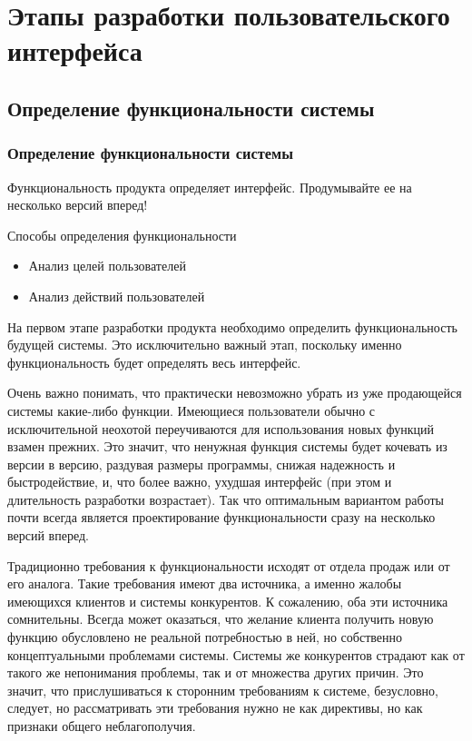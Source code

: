 \documentclass{../industrial-development}
\begin{document}
\section{Этапы разработки пользовательского интерфейса}

\subsection{Определение функциональности системы}

\begin{frame} \frametitle{Определение функциональности системы}

  \begin{block}{}
     Функциональность продукта определяет интерфейс. Продумывайте ее  на несколько версий вперед!
  \end{block}
  
  \begin{block}{Способы определения функциональности}
    \begin{itemize}
    \item Анализ целей пользователей
    \item Анализ действий пользователей
    \end{itemize}
  \end{block}
\end{frame}

\lecturenotes

На первом этапе разработки продукта необходимо определить функциональность будущей системы. Это исключительно важный этап, поскольку именно функциональность будет определять весь интерфейс.

Очень важно понимать, что практически невозможно убрать из уже продающейся системы какие-либо функции. Имеющиеся пользователи обычно с исключительной неохотой переучиваются для использования новых функций взамен прежних. Это значит, что ненужная функция системы будет кочевать из версии в версию, раздувая размеры программы, снижая надежность и быстродействие, и, что более важно, ухудшая интерфейс (при этом и длительность разработки возрастает). Так что оптимальным вариантом работы почти всегда является проектирование функциональности сразу на несколько версий вперед.

Традиционно требования к функциональности исходят от отдела продаж или от его аналога. Такие требования имеют два источника, а именно жалобы имеющихся клиентов и системы конкурентов. К сожалению, оба эти источника сомнительны. Всегда может оказаться, что желание клиента получить новую функцию обусловлено не реальной потребностью в ней, но собственно концептуальными проблемами системы. Системы же конкурентов страдают как от такого же непонимания проблемы, так и от множества других причин. Это значит, что прислушиваться к сторонним требованиям к системе, безусловно, следует, но рассматривать эти требования нужно не как директивы, но как признаки общего неблагополучия.
\end{document}
